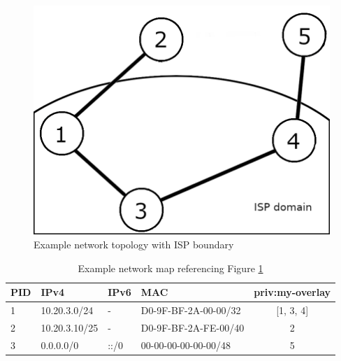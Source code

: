 
\begin{figure}[H]
        \centering
        \includegraphics[scale=1.00]{img/topology-boundary.png}
        \caption{Example network topology with ISP boundary}
        \label{fig:example-topology-boundary}
\end{figure}


\begin{table}[H]
\centering
\begin{tabular}{|l|l|l|l|c|}
    \hline
PID  & IPv4          & IPv6                  & MAC                  & priv:my-overlay                     \\ \hline
1    & 10.20.3.0/24  & -                     & D0-9F-BF-2A-00-00/32 & [1, 3, 4]                           \\ \hline
2    & 10.20.3.10/25 & -                     & D0-9F-BF-2A-FE-00/40 & 2                                   \\ \hline
3    & 0.0.0.0/0     & ::/0                  & 00-00-00-00-00-00/48 & 5                                   \\ \hline
\end{tabular}
\caption{Example network map referencing Figure \ref{fig:example-topology-boundary}}
\label{table:networkmap-example}
\end{table}

